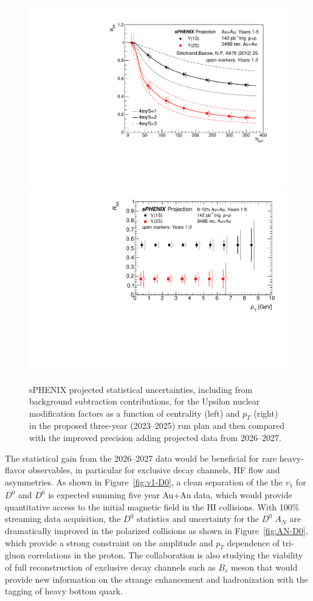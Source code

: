 \begin{figure}
    \centering
    \includegraphics[width=0.44\linewidth]{figs/upsilon_centrality_3yrs_5yrs_comparison.pdf}
    \includegraphics[width=0.47\linewidth]{figs/upsilon_RAA_2}
    \caption{sPHENIX projected statistical uncertainties,  including from background subtraction contributions, for the Upsilon nuclear modification factors as a function of centrality (left) and $p_T$ (right) in the proposed three-year (2023–2025) run plan and then compared with the improved precision adding projected data from 2026--2027.}
    \label{fig:RAA_upsilon_extrayears}
\end{figure}

The statistical gain from the 2026--2027 data would be beneficial for rare heavy-flavor observables, in particular for exclusive decay channels, HF flow and asymmetries. As shown in Figure~\ref{fig:v1-D0}, a clean separation of the the $v_1$ for $D^0$ and $\bar{D^0}$ is expected summing five year Au+Au data, which would provide quantitative access to the initial magnetic field in the HI collisions. With 100\% streaming data acquisition, the $D^0$ statistics and uncertainty for the $D^0$ $A_N$ are dramatically improved in the polarized \pp collisions as shown in Figure~\ref{fig:AN-D0}, which provide a strong constraint on the amplitude and $p_T$ dependence of tri-gluon correlations in the proton. 
The collaboration is also studying the viability of full reconstruction of exclusive decay channels such as $B_s$ meson that would provide new information on the strange enhancement and hadronization with the tagging of heavy bottom quark.  
 
